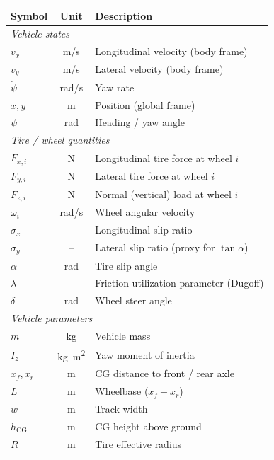 \documentclass[11pt,a4paper]{article}
\begin{document}
\begin{table}[H]
\centering
\begin{tabular}{lcl}
\toprule
\textbf{Symbol} & \textbf{Unit} & \textbf{Description} \\
\midrule
\multicolumn{3}{l}{\textit{Vehicle states}} \\
$v_x$            & \si{m/s}     & Longitudinal velocity (body frame) \\
$v_y$            & \si{m/s}     & Lateral velocity (body frame) \\
$\dot{\psi}$     & \si{rad/s}   & Yaw rate \\
$x, y$           & \si{m}       & Position (global frame) \\
$\psi$           & \si{rad}     & Heading / yaw angle \\
\midrule
\multicolumn{3}{l}{\textit{Tire / wheel quantities}} \\
$F_{x,i}$        & \si{N}       & Longitudinal tire force at wheel $i$ \\
$F_{y,i}$        & \si{N}       & Lateral tire force at wheel $i$ \\
$F_{z,i}$        & \si{N}       & Normal (vertical) load at wheel $i$ \\
$\omega_i$       & \si{rad/s}   & Wheel angular velocity \\
$\sigma_x$       & --           & Longitudinal slip ratio \\
$\sigma_y$       & --           & Lateral slip ratio (proxy for $\tan\alpha$) \\
$\alpha$         & \si{rad}     & Tire slip angle \\
$\lambda$        & --           & Friction utilization parameter (Dugoff) \\
$\delta$         & \si{rad}     & Wheel steer angle \\
\midrule
\multicolumn{3}{l}{\textit{Vehicle parameters}} \\
$m$              & \si{kg}      & Vehicle mass \\
$I_z$            & \si{kg.m^2}  & Yaw moment of inertia \\
$x_f, x_r$      & \si{m}       & CG distance to front / rear axle \\
$L$              & \si{m}       & Wheelbase ($x_f + x_r$) \\
$w$              & \si{m}       & Track width \\
$h_{\text{CG}}$  & \si{m}       & CG height above ground \\
$R$              & \si{m}       & Tire effective radius \\

\end{tabular}
\end{table}
\end{document}
